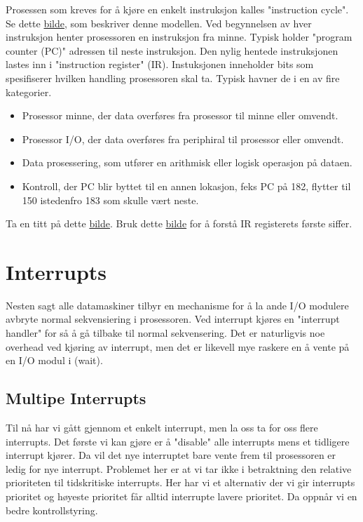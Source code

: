 Prosessen som kreves for å kjøre en enkelt instruksjon kalles "instruction cycle". Se dette  \href{http://imgs.g4estatic.com/operating-system/OS1.jpg}{bilde}, som beskriver denne modellen. Ved begynnelsen av hver instruksjon henter prosessoren en instruksjon fra minne. Typisk holder "program counter (PC)" adressen til neste instruksjon.
Den nylig hentede instruksjonen lastes inn i "instruction register" (IR). Instuksjonen inneholder bits som spesifiserer hvilken handling prosessoren skal ta. Typisk havner de i en av fire kategorier. 

\begin{itemize}
\item Prosessor minne, der data overføres fra prosessor til minne eller omvendt.
\item Prosessor I/O, der data overføres fra periphiral til prosessor eller omvendt.
\item Data prosessering, som utfører en arithmisk eller logisk operasjon på dataen.
\item Kontroll, der PC blir byttet til en annen lokasjon, feks PC på 182, flytter til 150 istedenfro 183 som skulle vært neste.
\end{itemize}

Ta en titt på dette \href{http://2.bp.blogspot.com/-cACbZDMWI94/VDC4qZXhj0I/AAAAAAAAAm0/KBuRv-CpoGg/s1600/example\%2Bof\%2Bprogram\%2Bexecution.jpg}{bilde}. Bruk dette \href{http://3.bp.blogspot.com/-7koSnx_IHVs/UYEFtR02NNI/AAAAAAAAAhM/i9uE_qS6RsU/s1600/characteristic+of+hypothetical+machine.png}{bilde} for å forstå IR registerets første siffer. 
\newline \newline
\section{Interrupts}
Nesten sagt alle datamaskiner tilbyr en mechanisme for å la ande I/O modulere avbryte normal sekvensiering i prosessoren.
Ved interrupt kjøres en "interrupt handler" for så å gå tilbake til normal sekvensering. Det er naturligvis noe overhead ved kjøring av interrupt, men det er likevell mye raskere en å vente på en I/O modul i (wait).
\subsection{Multipe Interrupts}
Til nå har vi gått gjennom et enkelt interrupt, men la oss ta for oss flere interrupts.
Det første vi kan gjøre er å "disable" alle interrupts mens et tidligere interrupt kjører. Da vil det nye interruptet bare vente frem til prosessoren er ledig for nye interrupt. Problemet her er at vi tar ikke i betraktning den relative prioriteten til tidskritiske interrupts. Her har vi et alternativ der vi gir interrupts prioritet og høyeste prioritet får alltid interrupte lavere prioritet. Da oppnår vi en bedre kontrollstyring. 

